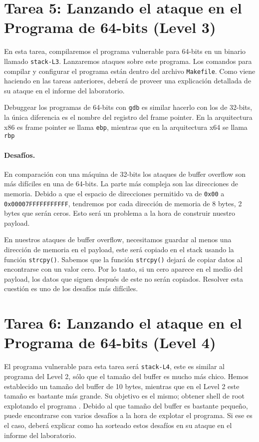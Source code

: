 \section{Tarea 5: Lanzando el ataque en el Programa de 64-bits (Level 3)}

En esta tarea, compilaremos el programa vulnerable para 64-bits en un binario llamado \texttt{stack-L3}. Lanzaremos ataques sobre este programa. Los comandos para compilar y configurar el programa están dentro del archivo \texttt{Makefile}. Como viene haciendo en las tareas anteriores, deberá de proveer una explicación detallada de su ataque en el informe del laboratorio.

Debuggear los programas de 64-bits con \texttt{gdb} es similar hacerlo con los de 32-bits, la única diferencia es el nombre del registro del frame pointer.
En la arquitectura x86 es frame pointer se llama \texttt{ebp}, mientras que en la arquitectura x64 se llama \texttt{rbp}


\paragraph{Desafíos.} En comparación con una máquina de 32-bits los ataques de buffer overflow son más difíciles en una de 64-bits. La parte más compleja son las direcciones de memoria. Debido a que el espacio de direcciones permitido va de \texttt{0x00} a \texttt{0x00007FFFFFFFFFFF}, tendremos por cada dirección de memoria de 8 bytes, 2 bytes que serán ceros.
Esto será un problema a la hora de construir nuestro payload.

En nuestros ataques de buffer overflow, necesitamos guardar al menos una dirección de memoria en el payload, este será copiado en el stack usando la función \texttt{strcpy()}. Sabemos que la función \texttt{strcpy()} dejará de copiar datos al encontrarse con un valor cero. Por lo tanto, si un cero
aparece en el medio del payload, los datos que siguen después de este no serán copiados. Resolver esta cuestión es uno de los desafíos más difíciles.




\section{Tarea 6: Lanzando el ataque en el Programa de 64-bits (Level 4)}

El programa vulnerable para esta tarea será \texttt{stack-L4}, este es similar al programa del Level 2, sólo que el tamaño del buffer es mucho más chico. Hemos establecido un tamaño del buffer de 10 bytes, mientras que en el Level 2 este tamaño es bastante más grande. 
Su objetivo es el mismo; obtener shell de root explotando el programa \setuid.
Debido al que tamaño del buffer es bastante pequeño, puede encontrarse con varios desafíos a la hora de explotar el programa.
Si ese es el caso, deberá explicar como ha sorteado estos desafíos en su ataque en el informe del laboratorio.



